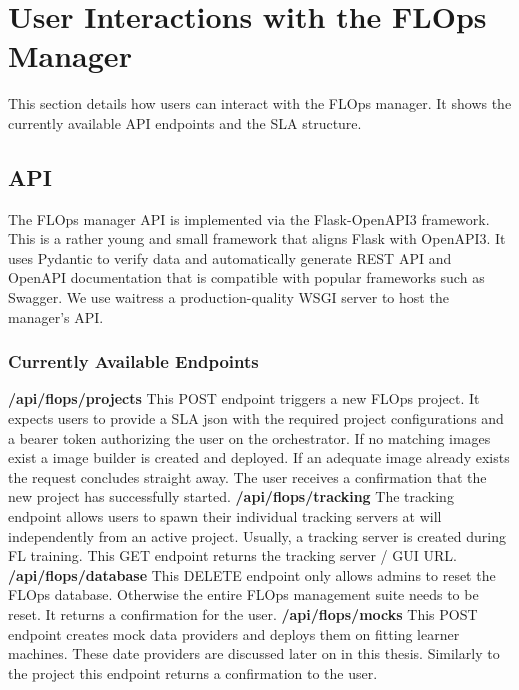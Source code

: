 \section{User Interactions with the FLOps Manager}
This section details how users can interact with the FLOps manager.
It shows the currently available API endpoints and the SLA structure.

    \subsection{API}
    The FLOps manager API is implemented via the Flask-OpenAPI3 framework.
    This is a rather young and small framework that aligns Flask with OpenAPI3.
    It uses Pydantic to verify data and automatically generate REST API and OpenAPI documentation that is compatible with popular frameworks such as Swagger.
    We use waitress a production-quality WSGI server to host the manager's API.

    \subsubsection{Currently Available Endpoints}
        \textbf{/api/flops/projects}\newline
        This POST endpoint triggers a new FLOps project.
        It expects users to provide a SLA json with the required project configurations and a bearer token authorizing the user on the orchestrator.
        If no matching images exist a image builder is created and deployed.
        If an adequate image already exists the request concludes straight away.
        The user receives a confirmation that the new project has successfully started.
        \vspace{5mm}
        \newline
        \textbf{/api/flops/tracking}\newline
        The tracking endpoint allows users to spawn their individual tracking servers at will independently from an active project.
        Usually, a tracking server is created during FL training.
        This GET endpoint returns the tracking server / GUI URL.
        \vspace{5mm}
        \newline
        \textbf{/api/flops/database}\newline
        This DELETE endpoint only allows admins to reset the FLOps database.
        Otherwise the entire FLOps management suite needs to be reset.
        It returns a confirmation for the user.
        \vspace{5mm}
        \newline
        \textbf{/api/flops/mocks}\newline
        This POST endpoint creates mock data providers and deploys them on fitting learner machines.
        These date providers are discussed later on in this thesis.
        Similarly to the project this endpoint returns a confirmation to the user.
        \vspace{5mm}
        \newline

